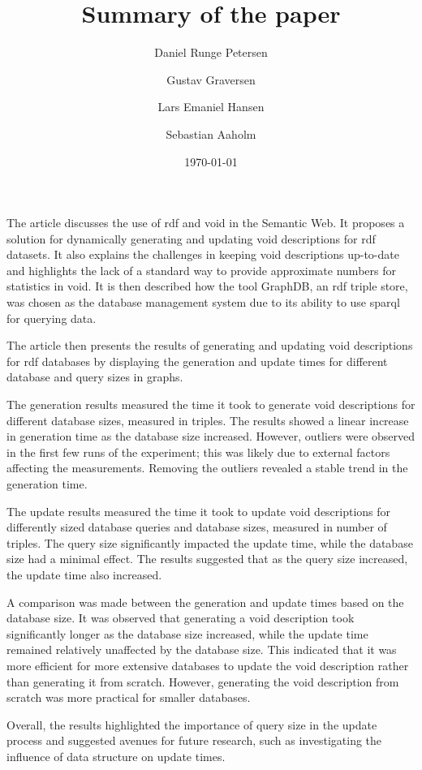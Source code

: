 \documentclass[a4paper]{article}
\title{Summary of the paper}
\date{\today}
\author{Daniel Runge Petersen \and Gustav Graversen \and Lars Emaniel Hansen \and Sebastian Aaholm}
\begin{document}
\maketitle
\thispagestyle{empty}

The article discusses the use of \gls{rdf} and \gls{void} in the Semantic Web. It proposes a solution for dynamically generating and updating \gls{void} descriptions for \gls{rdf} datasets. It also explains the challenges in keeping \gls{void} descriptions up-to-date and highlights the lack of a standard way to provide approximate numbers for statistics in \gls{void}. It is then described how the tool GraphDB, an \gls{rdf} triple store, was chosen as the database management system due to its ability to use \gls{sparql} for querying data.

The article then presents the results of generating and updating \gls{void} descriptions for \gls{rdf} databases by displaying the generation and update times for different database and query sizes in graphs.

The generation results measured the time it took to generate \gls{void} descriptions for different database sizes, measured in triples. The results showed a linear increase in generation time as the database size increased. However, outliers were observed in the first few runs of the experiment; this was likely due to external factors affecting the measurements. Removing the outliers revealed a stable trend in the generation time.

The update results measured the time it took to update \gls{void} descriptions for differently sized database queries and database sizes, measured in number of triples. The query size significantly impacted the update time, while the database size had a minimal effect. The results suggested that as the query size increased, the update time also increased.

A comparison was made between the generation and update times based on the database size. It was observed that generating a \gls{void} description took significantly longer as the database size increased, while the update time remained relatively unaffected by the database size. This indicated that it was more efficient for more extensive databases to update the \gls{void} description rather than generating it from scratch. However, generating the \gls{void} description from scratch was more practical for smaller databases.

Overall, the results highlighted the importance of query size in the update process and suggested avenues for future research, such as investigating the influence of data structure on update times.
\end{document}

